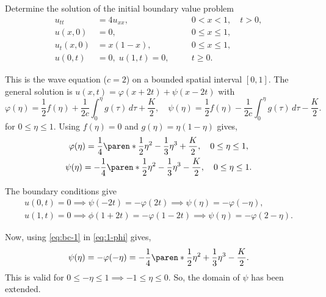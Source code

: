 \documentclass[11pt]{penrose}
\begin{document}
\clearpage
\begin{problem}{6}
    Determine the solution of the initial boundary value problem
    \begin{equation*}
        \begin{aligned}
            u_{tt} &= 4u_{xx}, & &0 < x < 1, \quad t > 0,\\
            u(x,0) &= 0, & &0 \leq x \leq 1,\\
            u_t(x,0) &= x(1-x), & &0 \leq x \leq 1,\\
            u(0,t) &= 0, \; u(1,t) = 0, & \quad &t \geq 0.
        \end{aligned}
    \end{equation*}
    
    \solution This is the wave equation ($c = 2$) on a bounded spatial interval $[0,1]$. The general solution is $u(x, t) = \varphi(x + 2t) + \psi(x - 2t)$ with
    \begin{equation*}
        \varphi(\eta) = \frac{1}{2} f(\eta) + \frac{1}{2c} \int_0^\eta g(\tau) \,d\tau + \frac{K}{2},
        \quad
        \psi(\eta) = \frac{1}{2} f(\eta) - \frac{1}{2c} \int_0^\eta g(\tau) \,d\tau - \frac{K}{2}.
    \end{equation*}
    for $0 \leq \eta \leq 1$. Using $f(\eta) = 0$ and $g(\eta) = \eta (1 - \eta)$ gives,
    \begin{gather}
        \varphi(\eta) = \frac{1}{4} \paren*{\frac{1}{2}\eta^2 - \frac{1}{3}\eta^3} + \frac{K}{2}, \quad 0 \leq \eta \leq 1, \label{eq:1-phi}\\
        \psi(\eta) = - \frac{1}{4} \paren*{\frac{1}{2}\eta^2 - \frac{1}{3}\eta^3} - \frac{K}{2}, \quad 0 \leq \eta \leq 1. \label{eq:1-psi}
    \end{gather}

    The boundary conditions give
    \begin{gather*}
        u(0,t) = 0 \implies \psi(-2t) = -\varphi(2t) \implies \psi(\eta) = -\varphi(-\eta), \tag{\textasteriskcentered} \label{eq:bc-1}\\
        u(1,t) = 0 \implies \phi(1+2t) = -\varphi(1-2t) \implies \psi(\eta) = -\varphi(2-\eta). \tag{\textasteriskcentered\textasteriskcentered} \label{eq:bc-2}
    \end{gather*}

    Now, using \eqref{eq:bc-1} in \eqref{eq:1-phi} gives,
    \begin{equation}
        \psi(\eta)
        = -\varphi(-\eta)
        = -\frac{1}{4} \paren*{\frac{1}{2}\eta^2 + \frac{1}{3}\eta^3} - \frac{K}{2}. \label{eq:2-psi}
    \end{equation}
    This is valid for $0 \leq -\eta \leq 1 \implies -1 \leq \eta \leq 0$. So, the domain of $\psi$ has been extended.


\end{problem}
\end{document}
